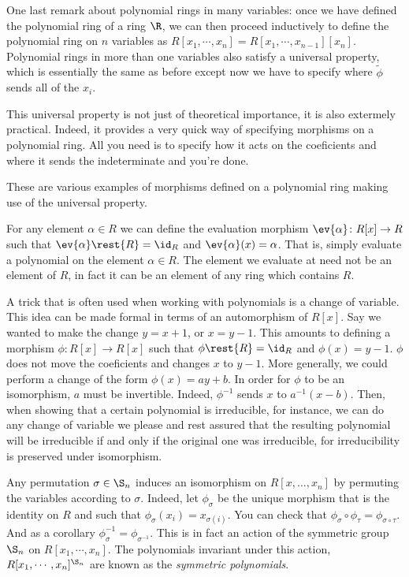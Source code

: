 \documentclass[12pt,oneside]{book}
\begin{document}
One last remark about polynomial rings in many variables: once we have defined the polynomial ring of a ring \( \R \), we can then proceed inductively to define the polynomial ring on \( n \) variables as \( R[x_1, \cdots, x_n] = R[x_1, \cdots, x_{n-1}][x_n] \). Polynomial rings in more than one variables also satisfy a universal property, which is essentially the same as before except now we have to specify where \( \tilde{\phi} \) sends all of the \( x_i \).

This universal property is not just of theoretical importance, it is also extermely practical. Indeed, it provides a very quick way of specifying morphisms on a polynomial ring. All you need is to specify how it acts on the coeficients and where it sends the indeterminate and you're done.

\begin{example}\label{exe:morphisms on polynomial rings}
	These are various examples of morphisms defined on a polynomial ring making use of the universal property.
	\begin{points}
	\item For any element \( \alpha \in R \) we can define the evaluation morphism \( \ev{\alpha} \colon R[x] \to R \) such that \( \ev{\alpha}\rest{R} = \id_R \) and \( \ev{\alpha}(x) = \alpha \). That is, simply evaluate a polynomial on the element \( \alpha \in R \). The element we evaluate at need not be an element of \( R \), in fact it can be an element of any ring which contains \( R \). 

	\item A trick that is often used when working with polynomials is a change of variable. This idea can be made formal in terms of an automorphism of \( R[x] \). Say we wanted to make the change \( y = x+1 \), or \( x = y-1 \). This amounts to defining a morphism \( \phi \colon R[x] \to R[x] \) such that \( \phi \rest{R} = \id_R \) and \( \phi(x) = y-1 \). \( \phi \) does not move the coeficients and changes \( x \) to \( y-1 \). More generally, we could perform a change of the form \( \phi(x) = ay + b \). In order for \( \phi \) to be an isomorphism, \( a \) must be invertible. Indeed, \( \phi^{-1} \) sends \( x \) to \( a^{-1}(x - b) \). Then, when showing that a certain polynomial is irreducible, for instance, we can do any change of variable we please and rest assured that the resulting polynomial will be irreducible if and only if the original one was irreducible, for irreducibility is preserved under isomorphism.	

	\item Any permutation \( \sigma \in \S_n \) induces an isomorphism on \( R[x, \dots, x_n] \) by permuting the variables according to \( \sigma \). Indeed, let \( \phi_{\sigma} \) be the unique morphism that is the identity on \( R \) and such that \( \phi_{\sigma}(x_i) = x_{\sigma(i)} \). You can check that \( \phi_{\sigma} \circ \phi_{\tau} = \phi_{\sigma \circ \tau} \). And as a corollary \( \phi_{\sigma}^{-1} = \phi_{\sigma^{-1}} \). This is in fact an action of the symmetric group \( \S_n \) on \( R[x_1, \cdots, x_n] \). The polynomials invariant under this action, \( R[x_1, \cdots, x_n]^{\S_n} \) are known as the \emph{symmetric polynomials}.


\end{points}
\end{example}
\end{document}
